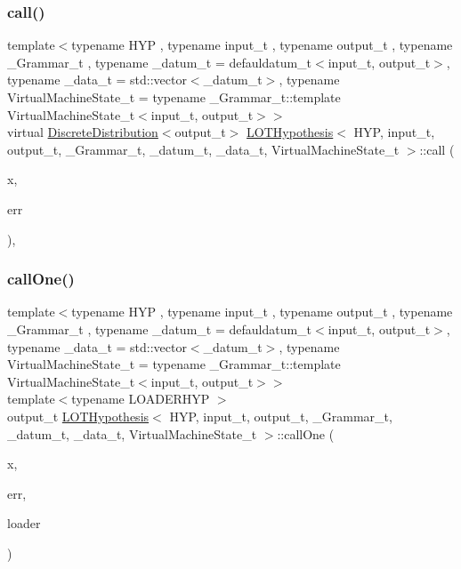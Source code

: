 \subsubsection{\texorpdfstring{call()}{call()}\hspace{0.1cm}{\footnotesize\ttfamily [2/2]}}
{\footnotesize\ttfamily template$<$typename H\+YP , typename input\+\_\+t , typename output\+\_\+t , typename \+\_\+\+Grammar\+\_\+t , typename \+\_\+datum\+\_\+t  = defauldatum\+\_\+t$<$input\+\_\+t, output\+\_\+t$>$, typename \+\_\+data\+\_\+t  = std\+::vector$<$\+\_\+datum\+\_\+t$>$, typename Virtual\+Machine\+State\+\_\+t  = typename \+\_\+\+Grammar\+\_\+t\+::template Virtual\+Machine\+State\+\_\+t$<$input\+\_\+t, output\+\_\+t$>$$>$ \\
virtual \hyperlink{class_discrete_distribution}{Discrete\+Distribution}$<$output\+\_\+t$>$ \hyperlink{class_l_o_t_hypothesis}{L\+O\+T\+Hypothesis}$<$ H\+YP, input\+\_\+t, output\+\_\+t, \+\_\+\+Grammar\+\_\+t, \+\_\+datum\+\_\+t, \+\_\+data\+\_\+t, Virtual\+Machine\+State\+\_\+t $>$\+::call (\begin{DoxyParamCaption}\item[{const input\+\_\+t}]{x,  }\item[{const output\+\_\+t}]{err }\end{DoxyParamCaption})\hspace{0.3cm}{\ttfamily [inline]}, {\ttfamily [virtual]}}

\mbox{\label{class_l_o_t_hypothesis_a34051e59cc251c4d6bb3caddbe594414}} 
\subsubsection{\texorpdfstring{call\+One()}{callOne()}\hspace{0.1cm}{\footnotesize\ttfamily [1/2]}}
{\footnotesize\ttfamily template$<$typename H\+YP , typename input\+\_\+t , typename output\+\_\+t , typename \+\_\+\+Grammar\+\_\+t , typename \+\_\+datum\+\_\+t  = defauldatum\+\_\+t$<$input\+\_\+t, output\+\_\+t$>$, typename \+\_\+data\+\_\+t  = std\+::vector$<$\+\_\+datum\+\_\+t$>$, typename Virtual\+Machine\+State\+\_\+t  = typename \+\_\+\+Grammar\+\_\+t\+::template Virtual\+Machine\+State\+\_\+t$<$input\+\_\+t, output\+\_\+t$>$$>$ \\
template$<$typename L\+O\+A\+D\+E\+R\+H\+YP $>$ \\
output\+\_\+t \hyperlink{class_l_o_t_hypothesis}{L\+O\+T\+Hypothesis}$<$ H\+YP, input\+\_\+t, output\+\_\+t, \+\_\+\+Grammar\+\_\+t, \+\_\+datum\+\_\+t, \+\_\+data\+\_\+t, Virtual\+Machine\+State\+\_\+t $>$\+::call\+One (\begin{DoxyParamCaption}\item[{const input\+\_\+t}]{x,  }\item[{const output\+\_\+t}]{err,  }\item[{L\+O\+A\+D\+E\+R\+H\+YP $\ast$}]{loader }\end{DoxyParamCaption})\hspace{0.3cm}{\ttfamily [inline]}}

